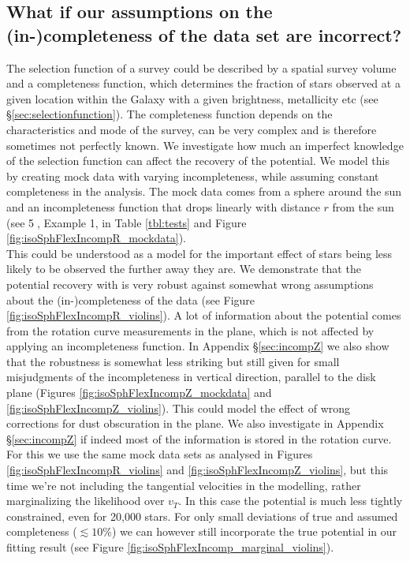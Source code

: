 \subsection{What if our assumptions on the (in-)completeness of the data set are incorrect?} \label{sec:results_incompR}

The selection function of a survey could be described by a spatial survey volume and a completeness function, which determines the fraction of stars observed at a given location within the Galaxy with a given brightness, metallicity etc (see \S\ref{sec:selectionfunction}). The completeness function depends on the characteristics and mode of the survey, can be very complex and is therefore sometimes not perfectly known. We investigate how much an imperfect knowledge of the selection function can affect the recovery of the potential. We model this by creating mock data with varying incompleteness, while assuming constant completeness in the analysis. The mock data comes from a sphere around the sun and an incompleteness function that drops linearly with distance $r$ from the sun (see \textcircled{5}, Example 1, in Table \ref{tbl:tests} and Figure \ref{fig:isoSphFlexIncompR_mockdata}).
\\This could be understood as a model for the important effect of stars being less likely to be observed the further away they are. We demonstrate that the potential recovery with \RM is very robust against somewhat wrong assumptions about the (in-)completeness of the data (see Figure \ref{fig:isoSphFlexIncompR_violins}). A lot of information about the potential comes from the rotation curve measurements in the plane, which is not affected by applying an incompleteness function. In Appendix \S\ref{sec:incompZ} we also show that the robustness is somewhat less striking but still given for small misjudgments of the incompleteness in vertical direction, parallel to the disk plane (Figures \ref{fig:isoSphFlexIncompZ_mockdata} and \ref{fig:isoSphFlexIncompZ_violins}). This could model the effect of wrong corrections for dust obscuration in the plane. We also investigate in Appendix \S\ref{sec:incompZ} if indeed most of the information is stored in the rotation curve. For this we use the same mock data sets as analysed in Figures \ref{fig:isoSphFlexIncompR_violins} and \ref{fig:isoSphFlexIncompZ_violins}, but this time we’re not including the tangential velocities in the modelling, rather marginalizing the likelihood over $v_T$. In this case the potential is much less tightly constrained, even for 20,000 stars. For only small deviations of true and assumed completeness ($\lesssim 10\%$) we can however still incorporate the true potential in our fitting result (see Figure \ref{fig:isoSphFlexIncomp_marginal_violins}). 



